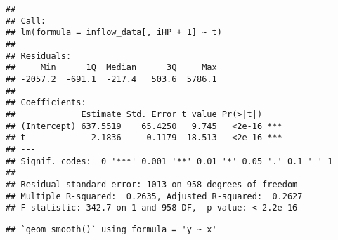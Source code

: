\documentclass[
]{article}
\newenvironment{Shaded}{\begin{snugshade}}{\end{snugshade}}
\newcommand{\AttributeTok}[1]{\textcolor[rgb]{0.77,0.63,0.00}{#1}}
\newcommand{\CommentTok}[1]{\textcolor[rgb]{0.56,0.35,0.01}{\textit{#1}}}
\newcommand{\DecValTok}[1]{\textcolor[rgb]{0.00,0.00,0.81}{#1}}
\newcommand{\FunctionTok}[1]{\textcolor[rgb]{0.00,0.00,0.00}{#1}}
\newcommand{\NormalTok}[1]{#1}
\newcommand{\OtherTok}[1]{\textcolor[rgb]{0.56,0.35,0.01}{#1}}
\newcommand{\SpecialCharTok}[1]{\textcolor[rgb]{0.00,0.00,0.00}{#1}}
\newcommand{\StringTok}[1]{\textcolor[rgb]{0.31,0.60,0.02}{#1}}
\begin{document}
\begin{verbatim}
## 
## Call:
## lm(formula = inflow_data[, iHP + 1] ~ t)
## 
## Residuals:
##     Min      1Q  Median      3Q     Max 
## -2057.2  -691.1  -217.4   503.6  5786.1 
## 
## Coefficients:
##             Estimate Std. Error t value Pr(>|t|)    
## (Intercept) 637.5519    65.4250   9.745   <2e-16 ***
## t             2.1836     0.1179  18.513   <2e-16 ***
## ---
## Signif. codes:  0 '***' 0.001 '**' 0.01 '*' 0.05 '.' 0.1 ' ' 1
## 
## Residual standard error: 1013 on 958 degrees of freedom
## Multiple R-squared:  0.2635, Adjusted R-squared:  0.2627 
## F-statistic: 342.7 on 1 and 958 DF,  p-value: < 2.2e-16
\end{verbatim}

\begin{Shaded}
\end{Shaded}

\begin{verbatim}
## `geom_smooth()` using formula = 'y ~ x'
\end{verbatim}
\end{document}
